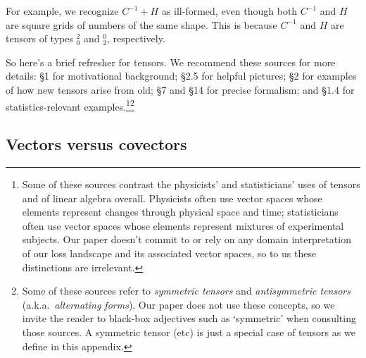 \documentclass[anon,12pt]{colt2021} %
\begin{document}
{        For example, we recognize $C^{-1} + H$ as ill-formed, even
        though both $C^{-1}$ and $H$ are square grids of
        numbers of the same shape.  This is because $C^{-1}$ and $H$ are
        tensors of types $^2_0$ and $^0_2$, respectively.

        So here's a brief refresher for tensors.  
        We recommend these sources for more details:
        \cite{si17} \S1 for motivational background;
        \cite{mi73} \S2.5 for helpful pictures;
        \cite{co14} \S2 for examples of how new tensors arise from old;
        \cite{ko93} \S7 and \S14 for precise formalism; and
        \cite{cu87} \S1.4 for statistics-relevant examples.\footnote{
            Some of these sources contrast the physicists' and statisticians'
            uses of tensors and of linear algebra overall.
            Physicists often use vector spaces whose elements represent changes
            through physical space and time; statisticians often use vector
            spaces whose elements represent mixtures of experimental subjects.
            Our paper doesn't commit to or rely on any domain interpretation
            of our loss landscape and its associated vector spaces, so to us
            these distinctions are irrelevant. 
        }\footnote{
            Some of these sources refer to
            \emph{symmetric tensors} and \emph{antisymmetric tensors} (a.k.a.\
            \emph{alternating forms}).  Our paper does not use these concepts,
            so we invite the reader to black-box adjectives such as
            `symmetric' when consulting those sources.  A symmetric tensor
            (etc) is just a special case of tensors as we define in this
            appendix.
        }
        \subsection{Vectors versus covectors}
            
}
\end{document}
